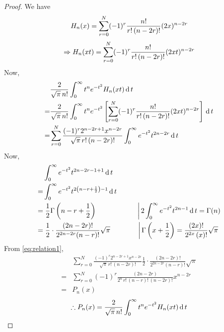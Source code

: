 \documentclass[../main-sheet.tex]{subfiles}
\begin{document}
\begin{proof}
    We have
    \[
        H_n(x)=\sum_{r=0}^N (-1)^r \frac{n!}{r!\,(n-2r)!}(2x)^{n-2r}
    \]
    \[
        \Rightarrow H_n(xt)= \sum_{r=0}^N (-1)^r \frac{n!}{r!\,(n-2r)!}(2 xt)^{n-2r}
    \]
    Now,
    \begin{align}
          & \frac{2}{\sqrt{\pi}\,n!}\int_0^\infty t^ne^{-t^2}H_n(xt)\,\mathrm{d}\, t\notag                                                             \\
        = & \frac{2}{\sqrt{\pi}\,n!}\int_0^\infty t^n e^{-t^2}\left[ \sum_{r=0}^N (-1)^r \frac{n!}{r!\,(n-2r)!}(2 xt)^{n-2r} \right]\,\mathrm{d}\, t\notag                                             \\
        = & \sum_{r=0}^N \frac{(-1)^r 2^{n-2r+1}x^{n-2r}}{\sqrt{\pi}\,r!\,(n-2r)!}\int_0^\infty e^{-t^2}t^{2n-2r}\,\mathrm{d}\, t \label{eq:relation1}
    \end{align}
    Now,
    \begin{align*}
          & \int_0^\infty e^{-t^2} t^{2n-2r-1+1} \,\mathrm{d}\, t                                                                                                                         \\
        = & \int_0^\infty e^{-t^2} t^{2\left(n-r+\frac{1}{2}\right)-1}\,\mathrm{d}\, t                                                                                                    \\
        = & \left. \frac{1}{2}\Gamma\left( n-r+\frac{1}{2} \right)\qquad \qquad\qquad\right\vert 2\int_0^\infty e^{-t^2} t^{2n-1}\,\mathrm{d}\, t =\Gamma(n)                              \\
        = & \left. \frac{1}{2}\cdot\frac{(2n-2r)!}{2^{2n-2r}(n-r)!}\sqrt{\pi}\qquad\qquad \right\vert \Gamma\left( x+\frac{1}{2} \right)=\frac{(2x)!}{2^{2x}\,(x)!}\sqrt{\pi} \\
    \end{align*}
    From \eqref{eq:relation1},
    \begin{align*}
          & \sum_{r=0}^N \frac{(-1)^r 2^{n-2r+1}x^{n-2r}}{\sqrt{\pi}\,r!\,(n-2r)!} \frac{1}{2}\cdot\frac{(2n-2r)!}{2^{2n-2r}(n-r)!}\sqrt{\pi} \\
        = & \sum_{r=0}^N (-1)^r \frac{(2n-2r)}{2^n\,r!\,(n-r)!\,(n-2r)!} x^{n-2r}                                                             \\
        = & P_n(x)
    \end{align*}
    \[
        \therefore P_n(x)=\frac{2}{\sqrt{\pi}\,n!}\int_0^\infty t^ne^{-t^2}H_n(xt)\,\mathrm{d}\, t
    \]
\end{proof}
\end{document}
